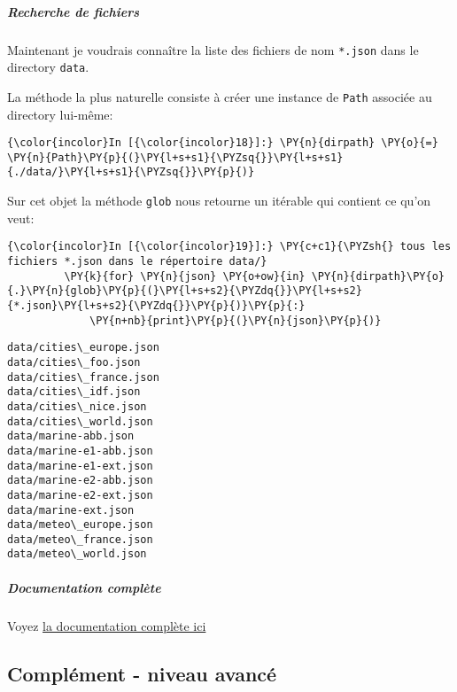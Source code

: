     \hypertarget{recherche-de-fichiers}{%
\subparagraph{Recherche de fichiers}\label{recherche-de-fichiers}}

    Maintenant je voudrais connaître la liste des fichiers de nom
\texttt{*.json} dans le directory \texttt{data}.

La méthode la plus naturelle consiste à créer une instance de
\texttt{Path} associée au directory lui-même:

    \begin{Verbatim}[commandchars=\\\{\},frame=single,framerule=0.3mm,rulecolor=\color{cellframecolor}]
{\color{incolor}In [{\color{incolor}18}]:} \PY{n}{dirpath} \PY{o}{=} \PY{n}{Path}\PY{p}{(}\PY{l+s+s1}{\PYZsq{}}\PY{l+s+s1}{./data/}\PY{l+s+s1}{\PYZsq{}}\PY{p}{)}
\end{Verbatim}


    Sur cet objet la méthode \texttt{glob} nous retourne un itérable qui
contient ce qu'on veut:

    \begin{Verbatim}[commandchars=\\\{\},frame=single,framerule=0.3mm,rulecolor=\color{cellframecolor}]
{\color{incolor}In [{\color{incolor}19}]:} \PY{c+c1}{\PYZsh{} tous les fichiers *.json dans le répertoire data/}
         \PY{k}{for} \PY{n}{json} \PY{o+ow}{in} \PY{n}{dirpath}\PY{o}{.}\PY{n}{glob}\PY{p}{(}\PY{l+s+s2}{\PYZdq{}}\PY{l+s+s2}{*.json}\PY{l+s+s2}{\PYZdq{}}\PY{p}{)}\PY{p}{:}
             \PY{n+nb}{print}\PY{p}{(}\PY{n}{json}\PY{p}{)}
\end{Verbatim}


    \begin{Verbatim}[commandchars=\\\{\},frame=single,framerule=0.3mm,rulecolor=\color{cellframecolor}]
data/cities\_europe.json
data/cities\_foo.json
data/cities\_france.json
data/cities\_idf.json
data/cities\_nice.json
data/cities\_world.json
data/marine-abb.json
data/marine-e1-abb.json
data/marine-e1-ext.json
data/marine-e2-abb.json
data/marine-e2-ext.json
data/marine-ext.json
data/meteo\_europe.json
data/meteo\_france.json
data/meteo\_world.json
\end{Verbatim}

    \hypertarget{documentation-compluxe8te}{%
\subparagraph{Documentation complète}\label{documentation-compluxe8te}}

    Voyez \href{https://docs.python.org/3/library/pathlib.html}{la
documentation complète ici}

    \hypertarget{compluxe9ment---niveau-avancuxe9}{%
\subsection{Complément - niveau
avancé}\label{compluxe9ment---niveau-avancuxe9}}

